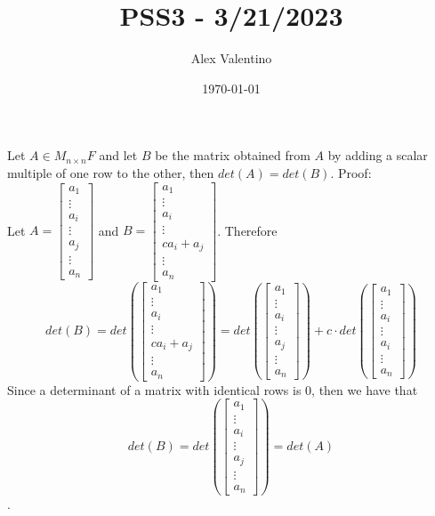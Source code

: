 \documentclass[12pt, letterpaper]{article}
\date{\today}
\author{Alex Valentino}
\title{PSS3 - 3/21/2023}
\begin{document}
	Let $A \in M_{n\times n} F$ and let $B$ be the matrix obtained from $A$ by adding a scalar multiple of one row to the other, then $det(A) = det(B)$.
	Proof:\\
	Let $A = \begin{bmatrix}
	a_1 \\
	\vdots\\
	a_i\\
	\vdots\\
	a_j\\
	\vdots\\
	a_n
	\end{bmatrix}$ and $B = \begin{bmatrix}
	a_1 \\
	\vdots\\
	a_i\\
	\vdots\\
	ca_i + a_j\\
	\vdots\\
	a_n
	\end{bmatrix}$.  Therefore 
	$$
	det(B) = det(\begin{bmatrix}
	a_1 \\
	\vdots\\
	a_i\\
	\vdots\\
	ca_i + a_j\\
	\vdots\\
	a_n
	\end{bmatrix})
	 = det(\begin{bmatrix}
	a_1 \\
	\vdots\\
	a_i\\
	\vdots\\
	a_j\\
	\vdots\\
	a_n
	\end{bmatrix}) + c \cdot det(\begin{bmatrix}
	a_1 \\
	\vdots\\
	a_i\\
	\vdots\\
	a_i\\
	\vdots\\
	a_n
	\end{bmatrix})
	$$
	Since a determinant of a matrix with identical rows is 0, then we have that $$det(B) = det(\begin{bmatrix}
	a_1 \\
	\vdots\\
	a_i\\
	\vdots\\
	a_j\\
	\vdots\\
	a_n
	\end{bmatrix}) = det(A)$$.
\end{document}
